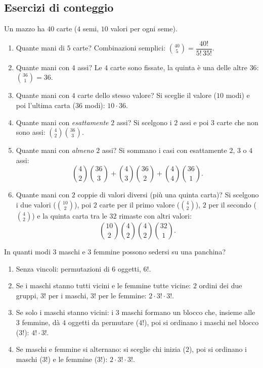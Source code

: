 \documentclass[11pt,a4paper]{article}
\begin{document}
\subsection{Esercizi di conteggio}

\begin{esempio}[Carte]
Un mazzo ha $40$ carte ($4$ semi, $10$ valori per ogni seme).
\begin{enumerate}
    \item Quante mani di $5$ carte? Combinazioni semplici: $\binom{40}{5} = \dfrac{40!}{5!\,35!}$.
    \item Quante mani con $4$ assi? Le $4$ carte sono fissate, la quinta è una delle altre $36$: $\binom{36}{1} = 36$.
    \item Quante mani con $4$ carte dello stesso valore? Si sceglie il valore ($10$ modi) e poi l'ultima carta ($36$ modi): $10 \cdot 36$.
    \item Quante mani con \emph{esattamente} $2$ assi? Si scelgono i $2$ assi e poi $3$ carte che non sono assi: $\binom{4}{2}\binom{36}{3}$.
    \item Quante mani con \emph{almeno} $2$ assi? Si sommano i casi con esattamente $2$, $3$ o $4$ assi:
    \[
    \binom{4}{2}\binom{36}{3} + \binom{4}{3}\binom{36}{2} + \binom{4}{4}\binom{36}{1}.
    \]
    \item Quante mani con $2$ coppie di valori diversi (più una quinta carta)? Si scelgono i due valori ($\binom{10}{2}$), poi $2$ carte per il primo valore ($\binom{4}{2}$), $2$ per il secondo ($\binom{4}{2}$) e la quinta carta tra le $32$ rimaste con altri valori:
    \[
    \binom{10}{2}\binom{4}{2}\binom{4}{2}\binom{32}{1}.
    \]
\end{enumerate}
\end{esempio}

\begin{esempio}[Panchina]
In quanti modi $3$ maschi e $3$ femmine possono sedersi su una panchina?
\begin{enumerate}
    \item Senza vincoli: permutazioni di $6$ oggetti, $6!$.
    \item Se i maschi stanno tutti vicini e le femmine tutte vicine: $2$ ordini dei due gruppi, $3!$ per i maschi, $3!$ per le femmine: $2 \cdot 3! \cdot 3!$.
    \item Se solo i maschi stanno vicini: i $3$ maschi formano un blocco che, insieme alle $3$ femmine, dà $4$ oggetti da permutare ($4!$), poi si ordinano i maschi nel blocco ($3!$): $4! \cdot 3!$.
    \item Se maschi e femmine si alternano: si sceglie chi inizia ($2$), poi si ordinano i maschi ($3!$) e le femmine ($3!$): $2 \cdot 3! \cdot 3!$.
\end{enumerate}
\end{esempio}
\end{document}
